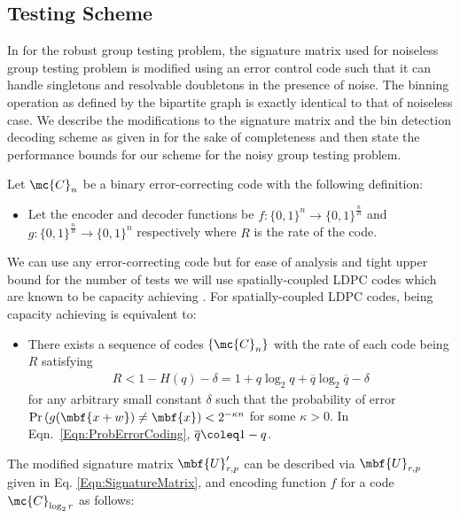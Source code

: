\documentclass[conference,twocolumn]{IEEEtran}
\begin{document}
\subsection*{Testing Scheme}
In \cite{lee2015saffron} for the robust group testing problem, the signature matrix used for noiseless group testing problem is modified using an error control code such that it can handle singletons and resolvable doubletons in the presence of noise. The binning operation as defined by the bipartite graph is exactly identical to that of noiseless case. We describe the modifications to the signature matrix and the bin detection decoding scheme as given in \cite{lee2015saffron} for the sake of completeness and then state the performance bounds for our scheme for the noisy group testing problem.

Let $\mc{C}_n$ be a binary error-correcting code with the following definition:
\begin{itemize}
\item Let the encoder and decoder functions be $f:\{0,1\}^{n}\rightarrow \{0,1\}^{\frac{n}{R}}$ and $g:\{0,1\}^{\frac{n}{R}}\rightarrow \{0,1\}^{n}$ respectively where $R$ is the rate of the code.
\end{itemize}
We can use any error-correcting code but for ease of analysis and tight upper bound for the number of tests we will use spatially-coupled LDPC codes which are known to be capacity achieving \cite{kumar2014threshold,kudekar2013spatially}. For spatially-coupled LDPC codes, being capacity achieving is equivalent to: 
\begin{itemize}
\item There exists a sequence of codes $\{\mc{C}_n\}$ with the rate of each code being $R$ satisfying 
\begin{align}
\label{Eqn:ProbErrorCoding}
R<1-H(q)-\delta=1+q\log_2 q+ \overline{q}\log_2\overline{q}-\delta
\end{align}
for any arbitrary small constant $\delta$ such that the probability of error $\text{Pr}\left(g(\mbf{x+w})\neq \mbf{x}\right)<2^{-\kappa n}$ for some $\kappa >0$. In Eqn.~\ref{Eqn:ProbErrorCoding}, $\overline{q}\coleq 1-q$. 
\end{itemize} 
The modified signature matrix $\mbf{U}'_{r,p}$ can be described via $\mbf{U}_{r, p}$ given in Eq. \eqref{Eqn:SignatureMatrix}, and encoding function $f$ for a code $\mc{C}_{\log_2 r}$ as follows:
\end{document}
